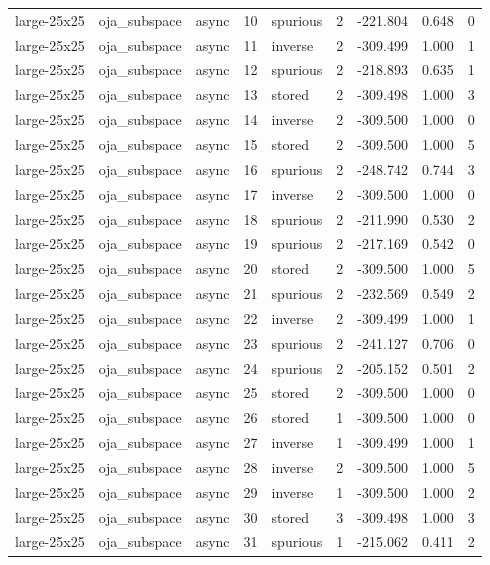 \begin{tabular}{lllrlrrrr}
large-25x25 & oja\_subspace & async & 10 & spurious & 2 & -221.804 & 0.648 & 0 \\
large-25x25 & oja\_subspace & async & 11 & inverse & 2 & -309.499 & 1.000 & 1 \\
large-25x25 & oja\_subspace & async & 12 & spurious & 2 & -218.893 & 0.635 & 1 \\
large-25x25 & oja\_subspace & async & 13 & stored & 2 & -309.498 & 1.000 & 3 \\
large-25x25 & oja\_subspace & async & 14 & inverse & 2 & -309.500 & 1.000 & 0 \\
large-25x25 & oja\_subspace & async & 15 & stored & 2 & -309.500 & 1.000 & 5 \\
large-25x25 & oja\_subspace & async & 16 & spurious & 2 & -248.742 & 0.744 & 3 \\
large-25x25 & oja\_subspace & async & 17 & inverse & 2 & -309.500 & 1.000 & 0 \\
large-25x25 & oja\_subspace & async & 18 & spurious & 2 & -211.990 & 0.530 & 2 \\
large-25x25 & oja\_subspace & async & 19 & spurious & 2 & -217.169 & 0.542 & 0 \\
large-25x25 & oja\_subspace & async & 20 & stored & 2 & -309.500 & 1.000 & 5 \\
large-25x25 & oja\_subspace & async & 21 & spurious & 2 & -232.569 & 0.549 & 2 \\
large-25x25 & oja\_subspace & async & 22 & inverse & 2 & -309.499 & 1.000 & 1 \\
large-25x25 & oja\_subspace & async & 23 & spurious & 2 & -241.127 & 0.706 & 0 \\
large-25x25 & oja\_subspace & async & 24 & spurious & 2 & -205.152 & 0.501 & 2 \\
large-25x25 & oja\_subspace & async & 25 & stored & 2 & -309.500 & 1.000 & 0 \\
large-25x25 & oja\_subspace & async & 26 & stored & 1 & -309.500 & 1.000 & 0 \\
large-25x25 & oja\_subspace & async & 27 & inverse & 1 & -309.499 & 1.000 & 1 \\
large-25x25 & oja\_subspace & async & 28 & inverse & 2 & -309.500 & 1.000 & 5 \\
large-25x25 & oja\_subspace & async & 29 & inverse & 1 & -309.500 & 1.000 & 2 \\
large-25x25 & oja\_subspace & async & 30 & stored & 3 & -309.498 & 1.000 & 3 \\
large-25x25 & oja\_subspace & async & 31 & spurious & 1 & -215.062 & 0.411 & 2 \\

\end{tabular}
